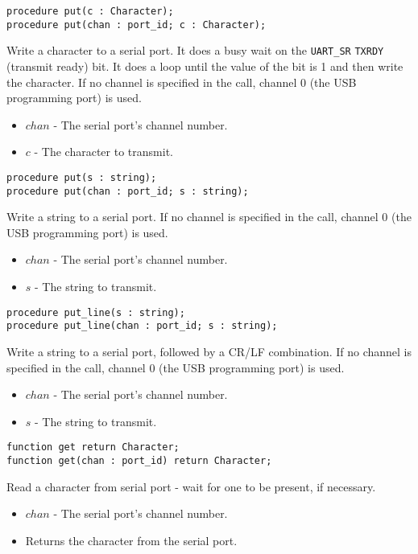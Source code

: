 \documentclass[10pt, openany]{book}
\newcommand{\indexfunc}[1]{\index[func]{#1}}
\newcommand{\package}[1]{\texttt{#1}}
\begin{document}
\begin{lstlisting}
procedure put(c : Character);
procedure put(chan : port_id; c : Character);
\end{lstlisting}
\indexfunc{put}
Write a character to a serial port.  It does a busy wait on the \package{UART\_SR} \package{TXRDY} (transmit ready) bit.  It does a loop until the value of the bit is 1 and then write the character.  If no channel is specified in the call, channel 0 (the USB programming port) is used.
\begin{itemize}
  \item $chan$ - The serial port's channel number.
  \item $c$ - The character to transmit.
\end{itemize}

\begin{lstlisting}
procedure put(s : string);
procedure put(chan : port_id; s : string);
\end{lstlisting}
\indexfunc{put}
Write a string to a serial port.  If no channel is specified in the call, channel 0 (the USB programming port) is used.
\begin{itemize}
  \item $chan$ - The serial port's channel number.
  \item $s$ - The string to transmit.
\end{itemize}

\begin{lstlisting}
procedure put_line(s : string);
procedure put_line(chan : port_id; s : string);
\end{lstlisting}
\indexfunc{put\_line}
Write a string to a serial port, followed by a CR/LF combination.  If no channel is specified in the call, channel 0 (the USB programming port) is used.
\begin{itemize}
  \item $chan$ - The serial port's channel number.
  \item $s$ - The string to transmit.
\end{itemize}

\begin{lstlisting}
function get return Character;
function get(chan : port_id) return Character;
\end{lstlisting}
\indexfunc{get}
Read a character from serial port - wait for one to be present, if necessary.
\begin{itemize}
  \item $chan$ - The serial port's channel number.
  \item Returns the character from the serial port.
\end{itemize}
\end{document}
